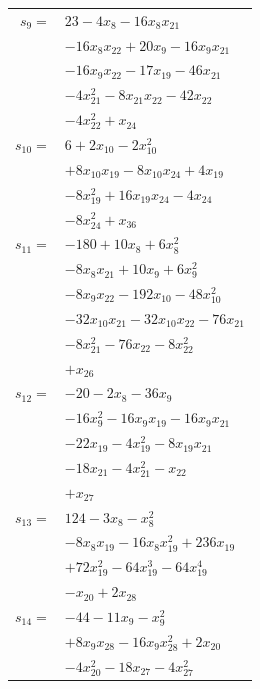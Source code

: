 \begin{longtable}{@{}r@{\;}l@{}}
\(s_{9}=\) & \(\displaystyle 23 -4x_{8} -16x_{8}x_{21}\) \\
 & \(\displaystyle -16x_{8}x_{22} +20x_{9} -16x_{9}x_{21}\) \\
 & \(\displaystyle -16x_{9}x_{22} -17x_{19} -46x_{21}\) \\
 & \(\displaystyle -4x_{21}^{2} -8x_{21}x_{22} -42x_{22}\) \\
 & \(\displaystyle -4x_{22}^{2} +x_{24}\) \\[3pt]
\(s_{10}=\) & \(\displaystyle 6 +2x_{10} -2x_{10}^{2}\) \\
 & \(\displaystyle +8x_{10}x_{19} -8x_{10}x_{24} +4x_{19}\) \\
 & \(\displaystyle -8x_{19}^{2} +16x_{19}x_{24} -4x_{24}\) \\
 & \(\displaystyle -8x_{24}^{2} +x_{36}\) \\[3pt]
\(s_{11}=\) & \(\displaystyle -180 +10x_{8} +6x_{8}^{2}\) \\
 & \(\displaystyle -8x_{8}x_{21} +10x_{9} +6x_{9}^{2}\) \\
 & \(\displaystyle -8x_{9}x_{22} -192x_{10} -48x_{10}^{2}\) \\
 & \(\displaystyle -32x_{10}x_{21} -32x_{10}x_{22} -76x_{21}\) \\
 & \(\displaystyle -8x_{21}^{2} -76x_{22} -8x_{22}^{2}\) \\
 & \(\displaystyle +x_{26}\) \\[3pt]
\(s_{12}=\) & \(\displaystyle -20 -2x_{8} -36x_{9}\) \\
 & \(\displaystyle -16x_{9}^{2} -16x_{9}x_{19} -16x_{9}x_{21}\) \\
 & \(\displaystyle -22x_{19} -4x_{19}^{2} -8x_{19}x_{21}\) \\
 & \(\displaystyle -18x_{21} -4x_{21}^{2} -x_{22}\) \\
 & \(\displaystyle +x_{27}\) \\[3pt]
\(s_{13}=\) & \(\displaystyle 124 -3x_{8} -x_{8}^{2}\) \\
 & \(\displaystyle -8x_{8}x_{19} -16x_{8}x_{19}^{2} +236x_{19}\) \\
 & \(\displaystyle +72x_{19}^{2} -64x_{19}^{3} -64x_{19}^{4}\) \\
 & \(\displaystyle -x_{20} +2x_{28}\) \\[3pt]
\(s_{14}=\) & \(\displaystyle -44 -11x_{9} -x_{9}^{2}\) \\
 & \(\displaystyle +8x_{9}x_{28} -16x_{9}x_{28}^{2} +2x_{20}\) \\
 & \(\displaystyle -4x_{20}^{2} -18x_{27} -4x_{27}^{2}\) \\

\end{longtable}
